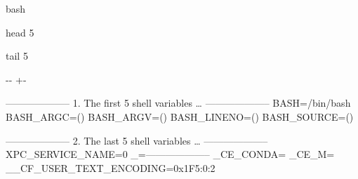 \documentclass[letterpaper,10pt,english]{sphinxmanual}
\newlength\nbsphinxcodecellspacing
\begin{document}
{
\begin{sphinxVerbatim}[commandchars=\\\{\}]
\llap{\color{nbsphinxin}[6]:\,\hspace{\fboxrule}\hspace{\fboxsep}}\PYGZpc{}\PYGZpc{}bash

 
 
 
  head \PYGZhy{}5

 
 
 
  tail \PYGZhy{}5
\end{sphinxVerbatim}
}

{

\kern-\sphinxverbatimsmallskipamount\kern-\baselineskip
\kern+\FrameHeightAdjust\kern-\fboxrule
\vspace{\nbsphinxcodecellspacing}

\begin{sphinxVerbatim}[commandchars=\\\{\}]
--------------------
1. The first 5 shell variables {\ldots}
--------------------
BASH=/bin/bash
BASH\_ARGC=()
BASH\_ARGV=()
BASH\_LINENO=()
BASH\_SOURCE=()

--------------------
2. The last 5 shell variables {\ldots}
--------------------
XPC\_SERVICE\_NAME=0
\_=--------------------
\_CE\_CONDA=
\_CE\_M=
\_\_CF\_USER\_TEXT\_ENCODING=0x1F5:0:2
\end{sphinxVerbatim}
}
\end{document}

